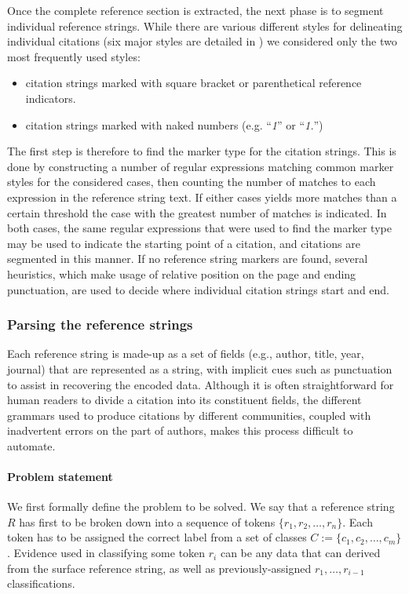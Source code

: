 Once the complete reference section is extracted, the next phase is to segment individual reference strings. While there are various different styles for delineating individual citations (six major styles are detailed in \cite{day2007}) we considered only the two most frequently used styles:
\begin{itemize}
 \item citation strings marked with square bracket or parenthetical reference indicators.
 \item citation strings marked with naked numbers (e.g. ``\emph{1}'' or ``\emph{1.}'')
\end{itemize}

The first step is therefore to find the marker type for the citation strings. This is done by constructing a number of regular expressions matching common marker styles for the considered cases, then counting the number of matches to each expression in the reference string text. If either cases yields more matches than a certain threshold the case with the greatest number of matches is indicated. In both cases, the same regular expressions that were used to find the marker type may be used to indicate the starting point of a citation, and citations are segmented in this manner. If no reference string markers are found, several heuristics, which make usage of relative position on the page and ending punctuation, are used to decide where individual citation strings start and end.

\subsubsection{Parsing the reference strings}
Each reference string is made-up as a set of fields (e.g., author, title, year, journal) that are represented as a string, with implicit cues such as punctuation to assist in recovering the encoded data. Although it is often straightforward for human readers to divide a citation into its constituent fields, the different grammars used to produce citations by different communities, coupled with inadvertent errors on the part of authors, makes this process difficult to automate.

\paragraph{Problem statement} We first formally define the problem to be solved. We say that a reference string $R$ has first to be broken down into a sequence of tokens $\{r_1, r_2, \ldots, r_n \}$. Each token has to be assigned the correct label from a set of classes $C:=\{c_1, c_2, \ldots, c_m\}$. Evidence used in classifying some token $r_i$ can be any data that can derived from the surface reference string, as well as previously-assigned $r_1, \ldots, r_{i-1}$ classifications.

